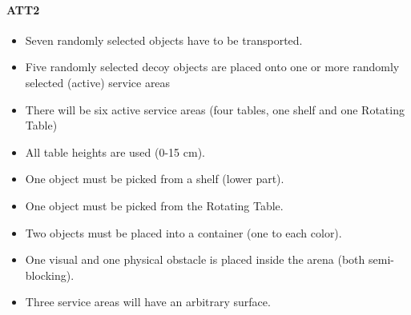 \paragraph{ATT2}
\begin{itemize}
\item Seven randomly selected objects have to be transported.
\item Five randomly selected decoy objects are placed onto one or more randomly selected (active)  service areas
\item There will be six active service areas (four tables, one shelf and one Rotating Table)
\item All table heights are used (0-15 $\si{\centi\meter}$).
\item One object must be picked from a shelf (lower part).
\item One object must be picked from the Rotating Table.
\item Two objects must be placed into a container (one to each color).
\item One visual and one physical obstacle is placed inside the arena (both semi-blocking).
\item Three service areas will have an arbitrary surface.
\end{itemize}